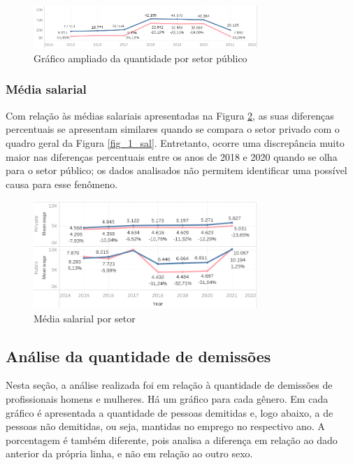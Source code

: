 \begin{figure}[htbp]
	\centerline{
		\includegraphics[width=85mm]{assets/3_1_qnt_pubpriv.PNG}
	}
	\caption{Gráfico ampliado da quantidade por setor público}
	\label{fig_3_1_qnt_pubpriv}
\end{figure}

\subsubsection{Média salarial}

Com relação às médias salariais apresentadas na Figura \ref{fig_3_sal_pubpriv}, as suas diferenças percentuais se apresentam similares quando se compara o setor privado com o quadro geral da Figura \ref{fig_1_sal}. Entretanto, ocorre uma discrepância muito maior nas diferenças percentuais entre os anos de 2018 e 2020 quando se olha para o setor público; os dados analisados não permitem identificar uma possível causa para esse fenômeno.

\begin{figure}[htbp]
	\centerline{
		\includegraphics[width=85mm]{assets/3_sal_pubpriv.PNG}
	}
	\caption{Média salarial por setor}
	\label{fig_3_sal_pubpriv}
\end{figure}

\subsection{Análise da quantidade de demissões}

Nesta seção, a análise realizada foi em relação à quantidade de demissões de profissionais homens e mulheres. Há um gráfico para cada gênero. Em cada gráfico é apresentada a quantidade de pessoas demitidas e, logo abaixo, a de pessoas não demitidas, ou seja, mantidas no emprego no respectivo ano. A porcentagem é também diferente, pois analisa a diferença em relação ao dado anterior da própria linha, e não em relação ao outro sexo.

